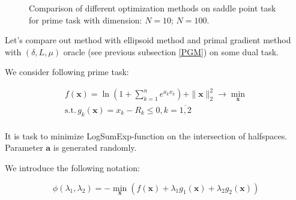 \documentclass[12pt]{article}
\begin{document}
\begin{figure}[h!]  
\vspace{-4ex} \centering {}  
\hspace{1.2ex}
\caption{Comparison of different optimization methods on saddle point task for prime task with dimension:   $N=10$;  $N=100$.} \label{fig:image}
\end{figure}

Let's compare out method with ellipsoid method and primal gradient method with $(\delta, L,\mu)$ oracle (see previous subsection \ref{PGM}) on some dual task.

We consider following prime task:

\begin{gather}
\label{prime}
f(\textbf{x}) = \ln \left(1+\sum_{k=1}^ne^{a_kx_k}\right) + \|\textbf{x}\|_2^2\rightarrow \min\limits_{\textbf{x}}\\
\text{s.t.}\,g_k(\textbf{x}) = x_k-R_k\leq0, k = \overline{1,2}\\
\end{gather}

It is task to minimize LogSumExp-function on the intersection of halfspaces. Parameter $\textbf{a}$ is generated randomly.

We introduce the following notation:

\begin{equation}
\label{phi}
\phi(\lambda_1, \lambda_2) = -\min\limits_{\textbf{x}}\left(f(\textbf{x}) +\lambda_1 g_1(\textbf{x}) +\lambda_2g_2(\textbf{x})\right)
\end{equation}
\end{document}
